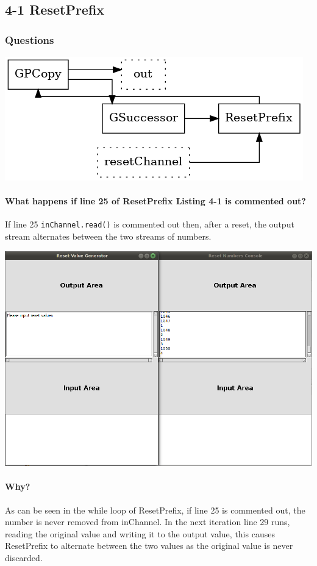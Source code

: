 \subsection{4-1 ResetPrefix}

\subsubsection*{Questions}

\includegraphics[width=\textwidth]{graphs/chapter4/4-1-1.png}

\paragraph{What happens if line {25} of ResetPrefix Listing 4-1 is commented out?}

If line 25 \texttt{inChannel.read()} is commented out then, after a reset, the output stream alternates between the two streams of numbers.

\includegraphics[width=\textwidth]{img/screenshots/4-1-1.png}

\paragraph{Why?}


As can be seen in the while loop of ResetPrefix, if line 25 is commented out, the number is never removed from inChannel.  In the next iteration line 29 runs, reading the original value and writing it to the output value, this causes ResetPrefix to alternate between the two values as the original value is never discarded.
